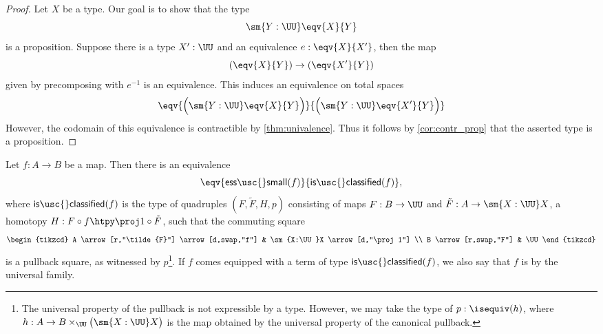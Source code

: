 \begin{proof}
Let $X$ be a type. Our goal is to show that the type
\begin{equation*}
\sm{Y:\UU}\eqv{X}{Y}
\end{equation*}
is a proposition. Suppose there is a type $X':\UU$ and an equivalence $e:\eqv{X}{X'}$, then the map
\begin{equation*}
(\eqv{X}{Y})\to (\eqv{X'}{Y})
\end{equation*}
given by precomposing with $e^{-1}$ is an equivalence. This induces an equivalence on total spaces
\begin{equation*}
\eqv{\Big(\sm{Y:\UU}\eqv{X}{Y}\Big)}{\Big(\sm{Y:\UU}\eqv{X'}{Y}\Big)}
\end{equation*}
However, the codomain of this equivalence is contractible by \cref{thm:univalence}. Thus it follows by \cref{cor:contr_prop} that the asserted type is a proposition.
\end{proof}

\begin{thm}\label{thm:classifier}
Let $f:A\to B$ be a map. Then there is an equivalence
\begin{equation*}
\eqv{\mathsf{ess\usc{}small}(f)}{\mathsf{is\usc{}classified}(f)},
\end{equation*}
where $\mathsf{is\usc{}classified}(f)$ is the type of quadruples $(F,\tilde{F},H,p)$ consisting of maps
$F:B\to \UU$ and $\tilde{F}:A\to \sm{X:\UU}X$, a homotopy $H:F\circ f\htpy \proj 1\circ \tilde{F}$,  such that the commuting square
\begin{equation*}
\begin{tikzcd}
A \arrow[r,"\tilde{F}"] \arrow[d,swap,"f"] & \sm{X:\UU}X \arrow[d,"\proj 1"] \\
B \arrow[r,swap,"F"] & \UU
\end{tikzcd}
\end{equation*}
is a pullback square, as witnessed by $p$\footnote{The universal property of the pullback is not expressible by a type. However, we may take the type of $p:\isequiv(h)$, where $h:A\to B\times_\UU\big(\sm{X:\UU}X\big)$ is the map obtained by the universal property of the canonical pullback.}. If $f$ comes equipped with a term of type $\mathsf{is\usc{}classified}(f)$, we also say that $f$ is  by the universal family. 
\end{thm}

